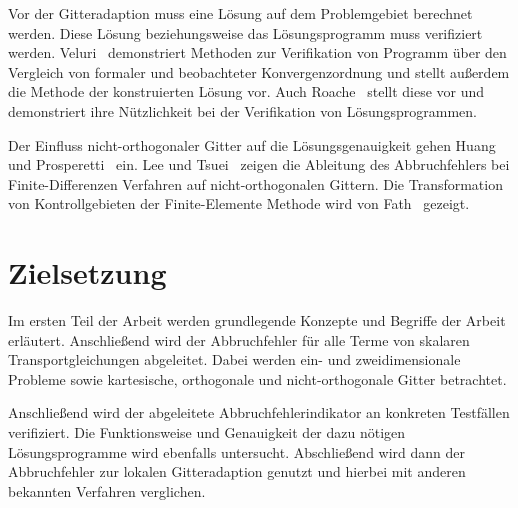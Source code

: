 Vor der Gitteradaption muss eine Lösung auf dem Problemgebiet berechnet werden. Diese
Lösung beziehungsweise das Lösungsprogramm muss verifiziert werden. Veluri~\cite{veluri} demonstriert
Methoden zur Verifikation von Programm über den Vergleich von formaler und beobachteter
Konvergenzordnung und stellt außerdem die Methode der konstruierten Lösung vor.
Auch Roache~\cite{roache} stellt diese vor und demonstriert ihre Nützlichkeit bei der Verifikation von
Lösungsprogrammen.

Der Einfluss nicht-orthogonaler Gitter auf die Lösungsgenauigkeit gehen Huang und Prosperetti~\cite{grid_ortho}
ein. Lee und Tsuei~\cite{lee} zeigen die Ableitung des Abbruchfehlers bei Finite-Differenzen Verfahren
auf nicht-orthogonalen Gittern. Die Transformation von Kontrollgebieten der Finite-Elemente Methode
wird von Fath~\cite{fath} gezeigt.

\section{Zielsetzung}

Im ersten Teil der Arbeit werden grundlegende Konzepte und Begriffe der Arbeit erläutert.
Anschließend wird der Abbruchfehler für alle Terme von skalaren Transportgleichungen
abgeleitet. Dabei werden ein- und zweidimensionale Probleme sowie kartesische, orthogonale
und nicht-orthogonale Gitter betrachtet.

Anschließend wird der abgeleitete Abbruchfehlerindikator an konkreten Testfällen verifiziert.
Die Funktionsweise und Genauigkeit der dazu nötigen Lösungsprogramme wird ebenfalls
untersucht. Abschließend wird dann der Abbruchfehler zur lokalen Gitteradaption genutzt
und hierbei mit anderen bekannten Verfahren verglichen.



\cleardoublepage
